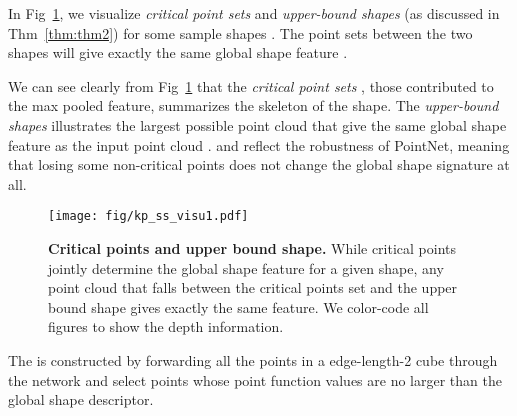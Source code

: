 \documentclass[10pt,twocolumn,letterpaper]{article}
\begin{document}
\begin{comment}
This visualization is similar to the kernel visualization in convolutional neural networks in the sense that we'd like to know what input patterns would activate a specific neuron. However, our point function is behaving in a very differnt way from conv kernels.
\end{comment}

In Fig~\ref{fig:recon}, we visualize \textit{critical point sets}  and \textit{upper-bound shapes}  (as discussed in Thm~\ref{thm:thm2}) for some sample shapes . The point sets between the two shapes will give exactly the same global shape feature . 

We can see clearly from Fig~\ref{fig:recon} that the \textit{critical point sets} , those contributed to the max pooled feature, summarizes the skeleton of the shape.
The \textit{upper-bound shapes}  illustrates the largest possible point cloud that give the same global shape feature  as the input point cloud .  and  reflect the robustness of PointNet, meaning that losing some non-critical points does not change the global shape signature  at all.





\begin{figure}[b]
    \centering
\texttt{[image: fig/kp\_ss\_visu1.pdf]}
    \caption{\textbf{Critical points and upper bound shape.} While critical points jointly determine the global shape feature for a given shape, any point cloud that falls between the critical points set and the upper bound shape gives exactly the same feature. We color-code all figures to show the depth information. }
    \label{fig:recon}
\end{figure}

The  is constructed by forwarding all the points in a edge-length-2 cube through the network and select points  whose point function values  are no larger than the global shape descriptor. 
\end{document}

